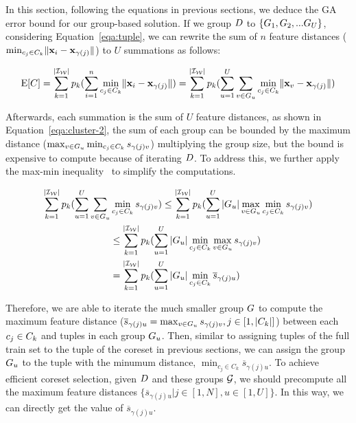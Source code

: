 In this section, following the equations in previous sections, we deduce the GA error bound for our group-based solution. 
%
If we group $D$ to $\{ G_1 , G_2, ...G_U\}$, considering Equation~\ref{eqa:tuple}, we  can rewrite the sum of $n$ feature distances (\ie $\min_{c_j\in C_k}\lVert\mathbf{x}_i - \mathbf{x}_{\gamma(j)}\rVert$) to $U$ summations as follows:

\begin{equation}\label{eqa:cluster-1}
    \mathrm{E}[C] = \sum_{k= 1}^{|\mathcal{I_W}|} p_k (\sum_{i=1}^n \min_{c_j\in C_k}\lVert\mathbf{x}_i - \mathbf{x}_{\gamma(j)}\rVert) =  \sum_{k= 1}^{|\mathcal{I_W}|} p_k (\sum_{u=1}^U\sum_{v \in G_u} \min_{c_j\in C_k}\lVert\mathbf{x}_v - \mathbf{x}_{\gamma(j)}\rVert)
\end{equation}

Afterwards, each summation is the sum of $U$ feature distances, as shown in Equation~\ref{eqa:cluster-2},  the sum of each group can be bounded by  the maximum distance ($\max_{v \in G_u} \min_{c_j\in C_k} s_{\gamma(j)v}$)  multiplying the  group size, but the bound is expensive to compute because of iterating $D$. To address this, we further apply the max-min inequality~\cite{boyd2004convex} to simplify the computations. 


\begin{equation}\label{eqa:cluster-2}
    \begin{aligned}
        \sum_{k= 1}^{|\mathcal{I_W}|} p_k (\sum_{u=1}^U\sum_{v \in G_u} & \min_{c_j\in C_k} s_{\gamma(j)v}) \leq \sum_{k= 1}^{|\mathcal{I_W}|} p_k (\sum_{u=1}^U |G_u| \max_{v \in G_u} \min_{c_j\in C_k}s_{\gamma(j)v}) \\
        & \leq \sum_{k= 1}^{|\mathcal{I_W}|} p_k (\sum_{u=1}^U |G_u| \min_{c_j\in C_k} \max_{v \in G_u}s_{\gamma(j)v}) \\
        & =  \sum_{k= 1}^{|\mathcal{I_W}|} p_k (\sum_{u=1}^U |G_u| \min_{c_j\in C_k} \overline{s}_{\gamma(j)u})
    \end{aligned}
\end{equation}



Therefore,  we are able to iterate the much smaller group $G$ to compute  the maximum feature distance (\ie $\overline{s}_{\gamma(j)u} = \max_{v \in G_u}s_{\gamma(j)v}, j \in [1,|C_k|]$) between each $c_j \in C_k$ and tuples in each group $G_u$. Then, similar to assigning tuples of the full train set to the tuple of the coreset in previous sections, we can assign the group $G_u$ to the tuple  with the minumum distance, \ie $\min_{c_j\in C_k} \overline{s}_{\gamma(j)u}$. To achieve efficient coreset selection, given $D$ and these groups $\mathcal{G}$, we should precompute all the maximum feature distances $\{\overline{s}_{\gamma(j)u}|j \in [1,N], u \in [1,U]\}$. In this way, we can directly get the value of $\overline{s}_{\gamma(j)u}$.

